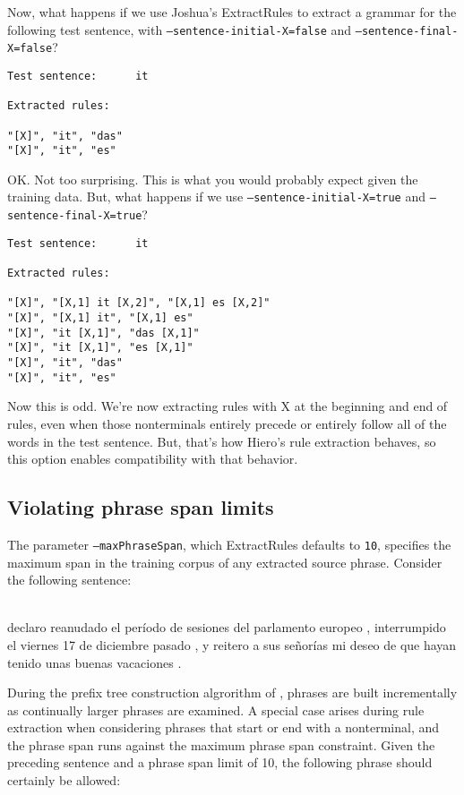 Now, what happens if we use Joshua's ExtractRules to extract a grammar for the following test sentence, with {\tt --sentence-initial-X=false} and {\tt --sentence-final-X=false}?

\begin{verbatim}
Test sentence:		it

Extracted rules:

"[X]", "it", "das"
"[X]", "it", "es"
\end{verbatim}

OK. Not too surprising. This is what you would probably expect given the training data. But, what happens if we use {\tt --sentence-initial-X=true} and {\tt --sentence-final-X=true}?

\begin{verbatim}
Test sentence:		it

Extracted rules:

"[X]", "[X,1] it [X,2]", "[X,1] es [X,2]"
"[X]", "[X,1] it", "[X,1] es"
"[X]", "it [X,1]", "das [X,1]"
"[X]", "it [X,1]", "es [X,1]"
"[X]", "it", "das"
"[X]", "it", "es"
\end{verbatim}

Now this is odd. We're now extracting rules with X at the beginning and end of rules, even when those nonterminals entirely precede or entirely follow all of the words in the test sentence. But, that's how Hiero's rule extraction behaves, so this option enables compatibility with that behavior.


\subsection{Violating phrase span limits}

The parameter {\tt --maxPhraseSpan}, which ExtractRules defaults to {\tt 10}, specifies the maximum span in the training corpus of any extracted source phrase. Consider the following sentence:

\begin{tt}
\ \\
declaro reanudado el per\'iodo de sesiones del parlamento europeo , interrumpido el viernes 17 de diciembre pasado , y reitero a sus se\~nor\'ias mi deseo de que hayan tenido unas buenas vacaciones .
\ \\
\end{tt}

During the prefix tree construction algrorithm of , phrases are built incrementally as continually larger phrases are examined.  A special case arises during rule extraction when considering phrases that start or end with a nonterminal, and the phrase span runs against the maximum phrase span constraint.  Given the preceding sentence and a phrase span limit of 10, the following phrase should certainly be allowed:


